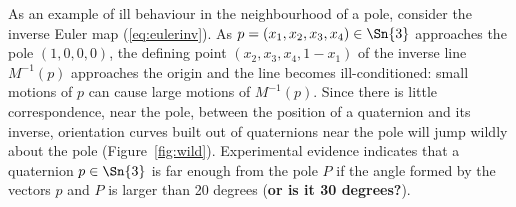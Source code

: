 \documentclass[12pt]{article}
\begin{document}
As an example of ill behaviour in the neighbourhood of a pole,
consider the inverse Euler map (\ref{eq:eulerinv}).
As $p = (x_1,x_2,x_3,x_4) \in \Sn{3}$ approaches the pole $(1,0,0,0)$,
the defining point $(x_2,x_3,x_4,1-x_1)$ of the inverse line $M^{-1}(p)$ 
approaches the origin
and the line becomes ill-conditioned:
small motions of $p$ can cause large motions of $M^{-1}(p)$.
%
%
Since there is little correspondence, near the pole,
between the position of a quaternion and its inverse,
orientation curves built out of quaternions near the pole will 
jump wildly about the pole (Figure~\ref{fig:wild}).  %
Experimental evidence indicates that a quaternion $p \in \Sn{3}$ is far enough from 
the pole $P$ if the angle formed by the vectors $p$ and $P$ is larger than 20 degrees
({\bf or is it 30 degrees?}).

\end{document}
